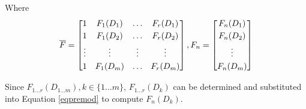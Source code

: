 Where
\begin{equation}
\notag
\overline{F} = \begin{bmatrix}
	1 & F_1(D_1) & \ldots & F_r(D_1) \\[0.3em]
	1 & F_1(D_2) & \ldots & F_r(D_2) \\[0.3em]
	\vdots & \vdots & \vdots & \vdots \\[0.3em]
	1 & F_1(D_m) & \ldots & F_r(D_m)
	\end{bmatrix}
,
F_n = \begin{bmatrix}
	F_n(D_1) \\[0.3em]
	F_n(D_2) \\[0.3em]
	\vdots \\[0.3em]
	F_n(D_m)
	\end{bmatrix}
\end{equation}

Since \(F_{1 \ldots r}(D_{1 \ldots m}), k \in \{1 \ldots m\}\), \(F_{1 \ldots r}(D_k)\)  can be determined and substituted into Equation \ref{eqpremod} to compute \(F_n(D_k)\). 
